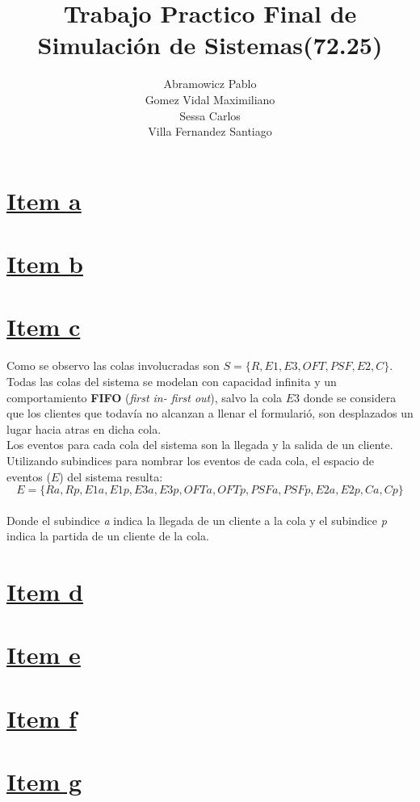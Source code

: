 \documentclass[a4paper,10pt]{article}
\title{Trabajo Practico Final de Simulaci\'on de Sistemas(72.25)}
\author{
Abramowicz Pablo\\
Gomez Vidal Maximiliano\\
Sessa Carlos\\
Villa Fernandez Santiago\\
}
\begin{document}
\maketitle

\section*{\underline{Item a}}
\section*{\underline{Item b}}
\section*{\underline{Item c}}
Como se observo las colas involucradas son $S = \{R, E1, E3, OFT, PSF, E2, C\}$.\\
Todas las colas del sistema se modelan con capacidad infinita y un comportamiento \textbf{FIFO} (\textit{first in- first out}), salvo la cola $E3$ 
donde se considera que los clientes que todav\'ia no alcanzan a llenar el formulari\'o, son desplazados un lugar hacia atras en dicha cola.\\
Los eventos para cada cola del sistema son la llegada y la salida de un cliente.
Utilizando subindices para nombrar los eventos de cada cola, el espacio de eventos ($E$) del sistema resulta:\\
$$E = \{Ra , Rp , E1a , E1p , E3a , E3p , OFTa , OFTp , PSFa , PSFp , E2a , E2p , Ca , Cp \}$$\\
Donde el subindice \textit{a} indica la llegada de un cliente a la cola y el subindice \textit{p} indica la partida de un cliente de la cola.

\section*{\underline{Item d}}
\section*{\underline{Item e}}
\section*{\underline{Item f}}
\section*{\underline{Item g}}
\end{document}

